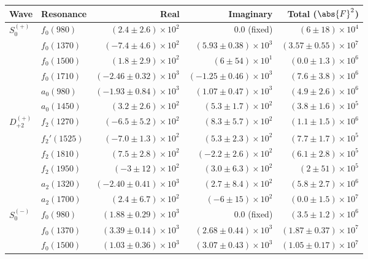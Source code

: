 \begin{table}[ht]
    \begin{center}
        \begin{tabular}{llrrr}\toprule
        Wave & Resonance & Real & Imaginary & Total ($\abs{F}^2$) \\\midrule
$S_{0}^{(+)}$ & $f_{0}(980)$ & $(2.4 \pm 2.6) \times 10^{2}$ & $0.0$ (fixed) & $(6 \pm 18) \times 10^{4}$ \\
 & $f_{0}(1370)$ & $(-7.4 \pm 4.6) \times 10^{2}$ & $(5.93 \pm 0.38) \times 10^{3}$ & $(3.57 \pm 0.55) \times 10^{7}$ \\
 & $f_{0}(1500)$ & $(1.8 \pm 2.9) \times 10^{2}$ & $(6 \pm 54) \times 10^{1}$ & $(0.0 \pm 1.3) \times 10^{6}$ \\
 & $f_{0}(1710)$ & $(-2.46 \pm 0.32) \times 10^{3}$ & $(-1.25 \pm 0.46) \times 10^{3}$ & $(7.6 \pm 3.8) \times 10^{6}$ \\
 & $a_{0}(980)$ & $(-1.93 \pm 0.84) \times 10^{3}$ & $(1.07 \pm 0.47) \times 10^{3}$ & $(4.9 \pm 2.6) \times 10^{6}$ \\
 & $a_{0}(1450)$ & $(3.2 \pm 2.6) \times 10^{2}$ & $(5.3 \pm 1.7) \times 10^{2}$ & $(3.8 \pm 1.6) \times 10^{5}$ \\
$D_{+2}^{(+)}$ & $f_{2}(1270)$ & $(-6.5 \pm 5.2) \times 10^{2}$ & $(8.3 \pm 5.7) \times 10^{2}$ & $(1.1 \pm 1.5) \times 10^{6}$ \\
 & $f_{2}'(1525)$ & $(-7.0 \pm 1.3) \times 10^{2}$ & $(5.3 \pm 2.3) \times 10^{2}$ & $(7.7 \pm 1.7) \times 10^{5}$ \\
 & $f_{2}(1810)$ & $(7.5 \pm 2.8) \times 10^{2}$ & $(-2.2 \pm 2.6) \times 10^{2}$ & $(6.1 \pm 2.8) \times 10^{5}$ \\
 & $f_{2}(1950)$ & $(-3 \pm 12) \times 10^{2}$ & $(3.0 \pm 6.3) \times 10^{2}$ & $(2 \pm 51) \times 10^{5}$ \\
 & $a_{2}(1320)$ & $(-2.40 \pm 0.41) \times 10^{3}$ & $(2.7 \pm 8.4) \times 10^{2}$ & $(5.8 \pm 2.7) \times 10^{6}$ \\
 & $a_{2}(1700)$ & $(2.4 \pm 6.7) \times 10^{2}$ & $(-6 \pm 15) \times 10^{2}$ & $(0.0 \pm 1.5) \times 10^{7}$ \\
$S_{0}^{(-)}$ & $f_{0}(980)$ & $(1.88 \pm 0.29) \times 10^{3}$ & $0.0$ (fixed) & $(3.5 \pm 1.2) \times 10^{6}$ \\
 & $f_{0}(1370)$ & $(3.39 \pm 0.14) \times 10^{3}$ & $(2.68 \pm 0.44) \times 10^{3}$ & $(1.87 \pm 0.37) \times 10^{7}$ \\
 & $f_{0}(1500)$ & $(1.03 \pm 0.36) \times 10^{3}$ & $(3.07 \pm 0.43) \times 10^{3}$ & $(1.05 \pm 0.17) \times 10^{7}$ \\

\end{tabular}
\end{center}
\end{table}
